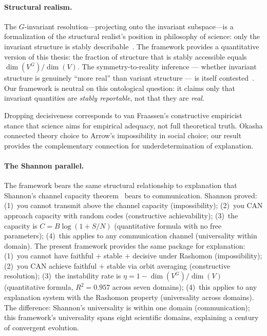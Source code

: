 \documentclass[11pt,a4paper]{article}
\begin{document}
\paragraph{Structural realism.}
The $G$-invariant resolution---projecting onto the invariant subspace---is a formalization of the structural realist's position in philosophy of science: only the invariant structure is stably describable~\citep{worrall1989structural,ladyman2007every}.  The framework provides a quantitative version of this thesis: the fraction of structure that is stably accessible equals $\dim(V^G)/\dim(V)$.  The symmetry-to-reality inference --- whether invariant structure is genuinely ``more real'' than variant structure --- is itself contested~\citep{dasgupta2016symmetry}.  Our framework is neutral on this ontological question: it claims only that invariant quantities are \emph{stably reportable}, not that they are \emph{real}.

Dropping decisiveness corresponds to van
Fraassen's \citep{vanfraassen1980scientific} constructive empiricist stance
that science aims for empirical adequacy, not full theoretical truth.
Okasha \citep{okasha2011theory} connected theory choice to Arrow's impossibility
in social choice; our result provides the complementary connection for
underdetermination of explanation.

\paragraph{The Shannon parallel.}
The framework bears the same structural relationship to explanation that
Shannon's channel capacity theorem~\citep{shannon1948mathematical} bears
to communication.  Shannon proved: (1)~you cannot transmit above the
channel capacity (impossibility); (2)~you CAN approach capacity with
random codes (constructive achievability); (3)~the capacity is
$C = B\log(1 + S/N)$ (quantitative formula with no free parameters);
(4)~this applies to any communication channel (universality within
domain).  The present framework provides the same package for explanation:
(1)~you cannot have faithful $+$ stable $+$ decisive under Rashomon
(impossibility); (2)~you CAN achieve faithful $+$ stable via orbit
averaging (constructive resolution); (3)~the instability rate is
$\eta = 1 - \dim(V^G)/\dim(V)$ (quantitative formula, $R^2 = 0.957$
across seven domains); (4)~this applies to any explanation system with
the Rashomon property (universality across domains).  The difference:
Shannon's universality is within one domain (communication); this
framework's universality spans eight scientific domains, explaining a
century of convergent evolution.
\end{document}
